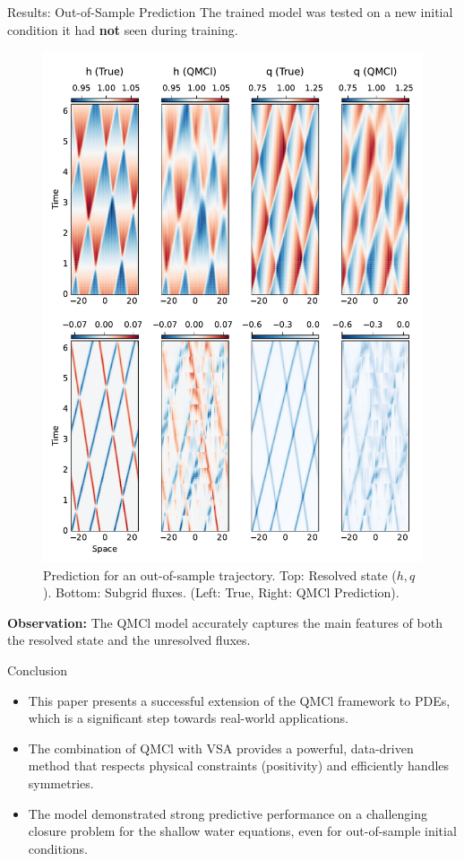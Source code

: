 \documentclass{beamer}
\begin{document}
\begin{frame}{Results: Out-of-Sample Prediction}
    The trained model was tested on a new initial condition it had \textbf{not} seen during training.
    \begin{figure}
        \centering
        \includegraphics[height=0.6\textheight, keepaspectratio]{paper/res01a.pdf}
        \caption{Prediction for an out-of-sample trajectory. Top: Resolved state ($h, q$). Bottom: Subgrid fluxes. (Left: True, Right: QMCl Prediction).}
        \label{fig:res01a}
    \end{figure}
    \textbf{Observation:} The QMCl model accurately captures the main features of both the resolved state and the unresolved fluxes.
\end{frame}

\begin{frame}{Conclusion}
    \begin{itemize}
        \item This paper presents a successful extension of the QMCl framework to PDEs, which is a significant step towards real-world applications.
        \vspace{0.5cm}
        \item The combination of QMCl with VSA provides a powerful, data-driven method that respects physical constraints (positivity) and efficiently handles symmetries.
        \vspace{0.5cm}
        \item The model demonstrated strong predictive performance on a challenging closure problem for the shallow water equations, even for out-of-sample initial conditions.
    \end{itemize}
\end{frame}
\end{document}
